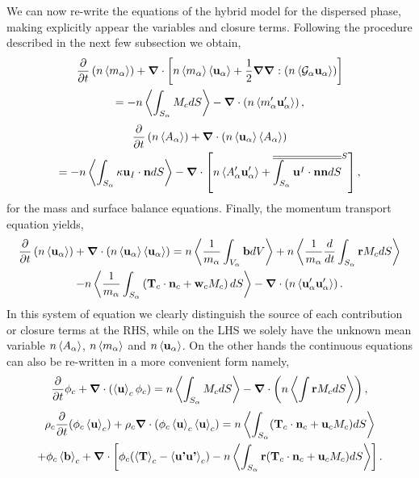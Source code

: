 We can now re-write the equations of the hybrid model for the dispersed phase, making explicitly appear the variables and closure terms.
Following the procedure described in the next few subsection we obtain, 
\begin{multline*}
    \frac{\partial}{\partial t}   \left(n \left<m_\alpha\right>\right)
    + \bm{\nabla} \cdot \left[n \left<m_\alpha\right> \left<\textbf{u}_\alpha\right> 
    + \frac{1}{2}\bm{\nabla}\bm{\nabla} : (n \left< \mathcal{G}_\alpha\textbf{u}_\alpha\right>)\right] \\
    = -n \left<\int_{S_\alpha} M_c d S\right>
    - \bm{\nabla} \cdot \left(n \left<m_\alpha' \textbf{u}_\alpha'\right> \right) ,
\end{multline*}
\begin{multline*}
    \frac{\partial}{\partial t} \left(n \left<A_\alpha\right>\right)
    + \bm{\nabla} \cdot \left(n \left<\textbf{u}_\alpha\right> \left<A_\alpha\right>\right)\\
    = -n \left<\int_{S_\alpha} \kappa\textbf{u}_I\cdot \textbf{n} dS \right>
    - \bm{\nabla} \cdot \left[
        n \left<A_\alpha' \textbf{u}_\alpha'\right>
        +\overline{\overline{ \int_{S_\alpha} \textbf{u}^I \cdot\textbf{nn} dS}}^S
    \right],
\end{multline*}
for the mass and surface balance equations. 
Finally, the momentum transport equation yields,
\begin{multline}
    \frac{\partial}{\partial t}   \left(n \left<\textbf{u}_\alpha\right>\right)
    + \bm{\nabla} \cdot \left(n \left<\textbf{u}_\alpha\right>\left<\textbf{u}_\alpha\right>\right)
    = n \left<\frac{1}{m_\alpha}\int_{V_\alpha} \textbf{b} dV\right>
    + n \left<\frac{1}{m_\alpha}\frac{d}{d t} \int_{S_\alpha} \textbf{r}M_c dS\right>\\
    - n \left<\frac{1}{m_\alpha}\int_{S_\alpha} \left(\textbf{T}_c  \cdot \textbf{n}_c  + \textbf{w}_c M_c \right) dS\right>
    - \bm{\nabla} \cdot \left(n \left<\textbf{u}_\alpha' \textbf{u}_\alpha'\right>\right). 
\end{multline}
In this system of equation we clearly distinguish the source of each contribution or closure terms at the RHS, while on the LHS we solely have the unknown mean variable $n \left<A_\alpha\right>$, $n \left<m_\alpha\right>$ and $n \left<\textbf{u}_\alpha\right>$. 
On the other hands the continuous equations can also be re-written in a more convenient form namely,
\begin{equation*}
    \frac{\partial}{\partial t} \phi_c 
    + \bm{\nabla} \cdot \left(
        \left<\textbf{u}\right>_c\phi_c 
    \right) 
    =  n \left<\int_{S_\alpha} M_c dS\right> 
    - \bm{\nabla} \cdot \left(
        n \left<\int \textbf{r} M_c dS\right>
    \right),
\end{equation*}
\begin{multline*}
    \rho_c \frac{\partial}{\partial t} (\phi_c\left<\textbf{u}\right>_c) 
    +\rho_c \bm{\nabla} \cdot ( \phi_c \left<\textbf{u}\right>_c\left<\textbf{u}\right>_c)
    = n \left<\int_{S_\alpha} (\textbf{T}_c  \cdot \textbf{n}_c + \textbf{u}_c M_c) d S\right>\\
    +\phi_c\left<\textbf{b}\right>_c
    + \bm{\nabla}\cdot\left[
    \phi_c (\left<\textbf{T}\right>_c
    - \left<\textbf{u'u'}\right>_c)
    - n \left<\int_{S_\alpha} \textbf{r} (\textbf{T}_c  \cdot \textbf{n}_c + \textbf{u}_c M_c)dS\right>
    \right].
\end{multline*}


